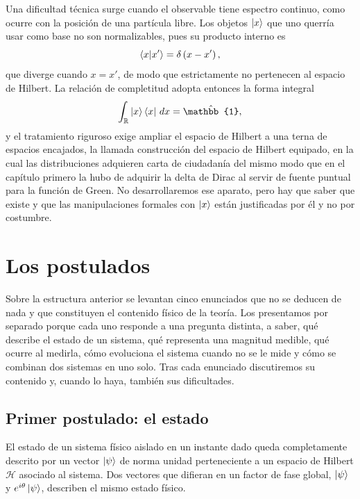         Una dificultad técnica surge cuando el observable tiene espectro continuo, como ocurre con la posición de una partícula libre. Los objetos $\ket{x}$ que uno querría usar como base no son normalizables, pues su producto interno es
        \begin{equation}\label{eq:NormalizacionContinua}
            \braket{x|x'} = \delta\left(x-x'\right),
        \end{equation}
        que diverge cuando $x = x'$, de modo que estrictamente no pertenecen al espacio de Hilbert. La relación de completitud adopta entonces la forma integral
        \begin{equation}\label{eq:CompletitudContinua}
            \int_{\mathbb{R}}\ket{x}\bra{x}\,dx = \hat{\mathbb{1}},
        \end{equation}
        y el tratamiento riguroso exige ampliar el espacio de Hilbert a una terna de espacios encajados, la llamada construcción del espacio de Hilbert equipado, en la cual las distribuciones adquieren carta de ciudadanía del mismo modo que en el capítulo primero la hubo de adquirir la delta de Dirac al servir de fuente puntual para la función de Green. No desarrollaremos ese aparato, pero hay que saber que existe y que las manipulaciones formales con $\ket{x}$ están justificadas por él y no por costumbre.

\section{Los postulados}

    Sobre la estructura anterior se levantan cinco enunciados que no se deducen de nada y que constituyen el contenido físico de la teoría. Los presentamos por separado porque cada uno responde a una pregunta distinta, a saber, qué describe el estado de un sistema, qué representa una magnitud medible, qué ocurre al medirla, cómo evoluciona el sistema cuando no se le mide y cómo se combinan dos sistemas en uno solo. Tras cada enunciado discutiremos su contenido y, cuando lo haya, también sus dificultades.

    \subsection{Primer postulado: el estado}

        \begin{Assumption}[Estado]\label{sup:Estado}
            El estado de un sistema físico aislado en un instante dado queda completamente descrito por un vector $\ket{\psi}$ de norma unidad perteneciente a un espacio de Hilbert $\mathcal{H}$ asociado al sistema. Dos vectores que difieran en un factor de fase global, $\ket{\psi}$ y $e^{i\theta}\ket{\psi}$, describen el mismo estado físico.
        \end{Assumption}

